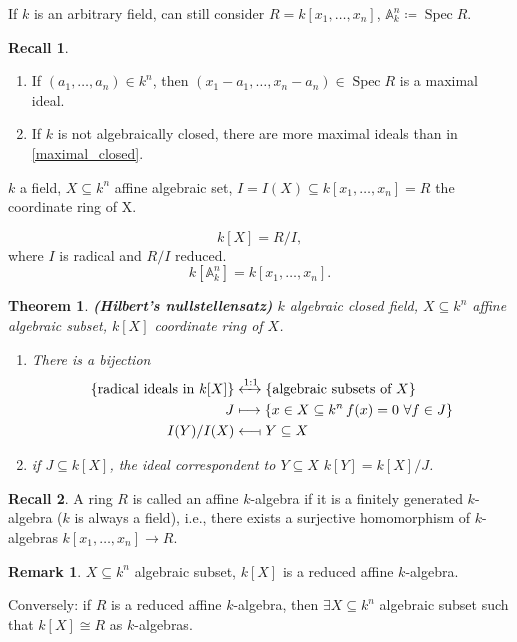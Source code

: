 \documentclass[12pt]{article}
\DeclareMathOperator{\Spec}{Spec}
\newtheorem*{theorem}{Theorem}
\theoremstyle{definition}
\newtheorem*{remark}{Remark}
\newtheorem*{recall}{Recall}
\begin{document}
If $k$ is an arbitrary field, can still consider $R=k[x_1,\ldots,x_n]$, $\mathbb{A}_k^n\coloneqq\Spec R$.

\begin{recall}
\begin{enumerate}[label=\arabic*)]
\item\label{maximal_closed} If $(a_1,\ldots,a_n)\in k^n$, then $(x_1-a_1,\ldots,x_n-a_n)\in\Spec R$ is a maximal ideal.

\item If $k$ is not algebraically closed, there are more maximal ideals than in \ref{maximal_closed}.
\end{enumerate}
\end{recall}

$k$ a field, $X\subseteq k^n$ affine algebraic set, $I=I(X)\subseteq k[x_1,\ldots,x_n]=R$ the coordinate ring of X.

\[k[X]=R/I,\]
where $I$ is radical and $R/I$ reduced.
\[k[\mathbb{A}_k^n]=k[x_1,\ldots,x_n].\]

\begin{theorem}
\emph{\textbf{(Hilbert's nullstellensatz)}} $k$ algebraic closed field, $X\subseteq k^n$ affine algebraic subset, $k[X]$ coordinate ring of $X$.

\begin{enumerate}[label=\arabic*)]
\item There is a bijection
\begin{align*}
\{\text{radical ideals in }k[X]\}&\xleftrightarrow{1:1}\{\text{algebraic subsets of }X\}\\
J&\longmapsto\{x\in X\subseteq k^n\,f(x)=0\ \forall f\in J\}\\
I(Y)/I(X)&\longleftarrow\!\shortmid Y\subseteq X
\end{align*}

\item if $J\subseteq k[X]$, the ideal correspondent to $Y\subseteq X$ $k[Y]=k[X]/J$.
\end{enumerate}
\end{theorem}

\begin{recall}
A ring $R$ is called an affine $k$-algebra if it is a finitely generated $k$-algebra ($k$ is always a field), i.e., there exists a surjective homomorphism of $k$-algebras $k[x_1,\ldots,x_n]\rightarrow R$.
\end{recall}

\begin{remark}
$X\subseteq k^n$ algebraic subset, $k[X]$ is a reduced affine $k$-algebra.

Conversely: if $R$ is a reduced affine $k$-algebra, then $\exists X\subseteq k^n$ algebraic subset such that $k[X]\cong R$ as $k$-algebras.
\end{remark}
\end{document}
